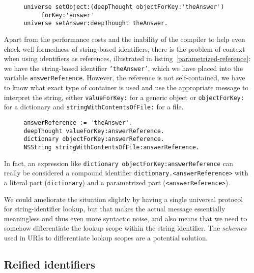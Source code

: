 \documentclass[preprint,authoryear]{acm_proc_article-sp}
\begin{document}
\begin{figure}[htbp]
\begin{lstlisting}[style=numbers,label=string-bloat,caption=Bloat with keyed access.]
universe setObject:(deepThought objectForKey:'theAnswer')
	 forKey:'answer'
universe setAnswer:deepThought theAnswer.
\end{lstlisting}
\end{figure}

Apart from the performance costs and the inability of the compiler to help
even check well-formedness of string-based identifiers, there is the problem
of context when using identifiers as references, illustrated in listing~\ref{parametrized-reference}:
we have the string-based identifier {\tt 'theAnswer'}, which we have placed into the
variable {\tt answerReference}.   However, the reference is not self-contained, we
have to know what exact type of container is used and use the appropriate message
to interpret the string, either {\tt valueForKey:} for a generic object or {\tt objectForKey:}
for a dictionary and {\tt stringWithContentsOfFile:} for a file.


\begin{figure}[htbp]
\begin{lstlisting}[style=numbers,label=parametrized-reference,caption=Indeterminate references.]
answerReference := 'theAnswer'.
deepThought valueForKey:answerReference.
dictionary objectForKey:answerReference.
NSString stringWithContentsOfFile:answerReference.
\end{lstlisting}
\end{figure}

In fact, an expression like {\tt dictionary objectForKey:answerReference} can really
be considered a compound identifier {\tt dictionary.<answerReference>} with
a literal part ({\tt dictionary}) and a parametrized part ({\tt <answerReference>}).

We could ameliorate the situation slightly by having a single universal protocol
for string-identifier lookup, but that makes the actual message essentially
meaningless and thus even more syntactic noise, and also means that we need
to somehow differentiate the lookup scope within the string identifier.   The
{\em schemes} used in URIs to differentiate lookup scopes are a potential
solution.


\subsection{Reified identifiers}
\end{document}
